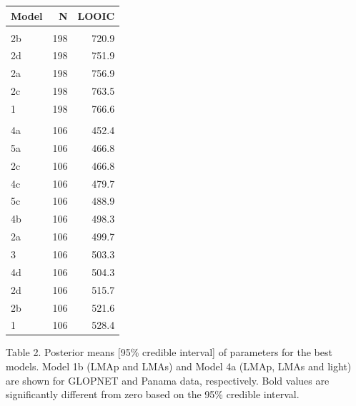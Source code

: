 \documentclass[
  12pt,
  a4paper,
,tablecaptionabove
]{scrartcl}
\begin{document}
\begin{table}
\centering
\begin{tabular}{lrr}
\toprule
Model & N & LOOIC\\
\midrule
\addlinespace[0.3em]
\multicolumn{3}{l}{\textbf{GLOPNET}}\\
\hspace{1em}2b & 198 & 720.9\\
\hspace{1em}2d & 198 & 751.9\\
\hspace{1em}2a & 198 & 756.9\\
\hspace{1em}2c & 198 & 763.5\\
\hspace{1em}1 & 198 & 766.6\\
\addlinespace[0.3em]
\multicolumn{3}{l}{\textbf{Panama}}\\
\hspace{1em}4a & 106 & 452.4\\
\hspace{1em}5a & 106 & 466.8\\
\hspace{1em}2c & 106 & 466.8\\
\hspace{1em}4c & 106 & 479.7\\
\hspace{1em}5c & 106 & 488.9\\
\hspace{1em}4b & 106 & 498.3\\
\hspace{1em}2a & 106 & 499.7\\
\hspace{1em}3 & 106 & 503.3\\
\hspace{1em}4d & 106 & 504.3\\
\hspace{1em}2d & 106 & 515.7\\
\hspace{1em}2b & 106 & 521.6\\
\hspace{1em}1 & 106 & 528.4\\
\bottomrule
\end{tabular}
\end{table}

\newpage

Table 2.
Posterior means {[}95\% credible interval{]} of parameters for the best models. Model 1b (LMAp and LMAs) and Model 4a (LMAp, LMAs and light) are shown for GLOPNET and Panama data, respectively.
Bold values are significantly different from zero based on the 95\% credible interval.
\end{document}
